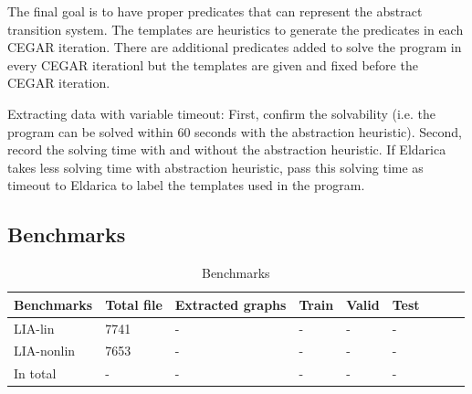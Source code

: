 \documentclass{article}
\begin{document}
The final goal is to have proper predicates that can represent the abstract transition system. The templates are heuristics to generate the predicates in each CEGAR iteration. There are additional predicates added to solve the program in every CEGAR iterationl but the templates are given and fixed before the CEGAR iteration.

%
%

Extracting data with variable timeout: First, confirm the solvability (i.e. the program can be solved within 60 seconds with the abstraction heuristic).
Second, record the solving time with and without the abstraction heuristic. If Eldarica takes less solving time with abstraction heuristic, pass this solving time as timeout to Eldarica to label the templates used in the program.


\subsection{Benchmarks}



\begin{table}\caption{Benchmarks}
\begin{center}
\begin{tabular}{lp{1cm}p{1cm}p{1.5cm}p{1.5cm}p{1.5cm}p{1.5cm}p{1.5cm}p{1.5cm}}
\hline
Benchmarks  & Total file & Extracted graphs & Train & Valid & Test  \\
\hline
LIA-lin       & 7741 & - & - & - & - \\
LIA-nonlin    & 7653 & - & - & - & - \\
In total      & - & - & - & - & -\\
\hline
\end{tabular}
\end{center}
\end{table}
\end{document}
